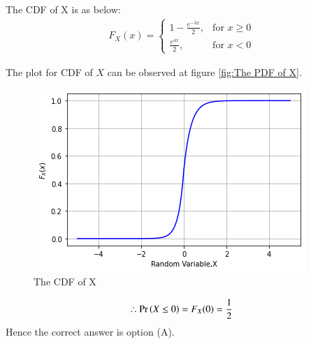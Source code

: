 \documentclass[journal,12pt,twocolumn]{IEEEtran}
\begin{document}
The CDF of X is as below:
\begin{align}
 F_X(x) = 
  \begin{cases}
  1-\frac{e^{-3x}}{2}, & \text{for } x \geq 0\\
  \frac{e^{4x}}{2}, & \text{for } x < 0
  \end{cases}
\end{align}

The plot for CDF of $X$ can be observed at figure \ref{fig:The PDF of X}.
\begin{figure}[!ht]
       \centering
    \includegraphics[width=.9\columnwidth] {Assignment_2_Fig_1.png}
    \caption{The CDF of X}
    \label{fig:The CDF of X}
\end{figure}

\begin{align}
\therefore
\Pr\left(X\leq0\right) = F_X(0)=\frac{1}{2}
\end{align}
Hence the correct answer is option (A).
\end{document}

